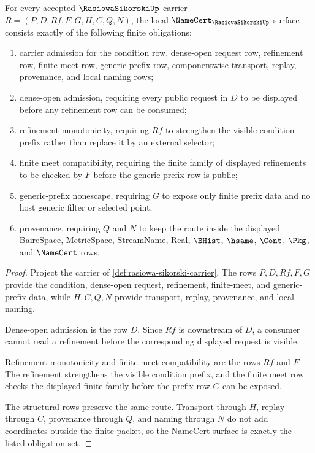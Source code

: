 \begin{theorem}
\label{thm:rasiowa-sikorski-namecert-obligations}
For every accepted $\RasiowaSikorskiUp$ carrier $R=(P,D,Rf,F,G,H,C,Q,N)$, the local $\NameCert_{\RasiowaSikorskiUp}$ surface consists exactly of the following finite obligations:
\begin{enumerate}
\item carrier admission for the condition row, dense-open request row, refinement row, finite-meet row, generic-prefix row, componentwise transport, replay, provenance, and local naming rows;
\item dense-open admission, requiring every public request in $D$ to be displayed before any refinement row can be consumed;
\item refinement monotonicity, requiring $Rf$ to strengthen the visible condition prefix rather than replace it by an external selector;
\item finite meet compatibility, requiring the finite family of displayed refinements to be checked by $F$ before the generic-prefix row is public;
\item generic-prefix nonescape, requiring $G$ to expose only finite prefix data and no host generic filter or selected point;
\item provenance, requiring $Q$ and $N$ to keep the route inside the displayed BaireSpace, MetricSpace, StreamName, Real, $\BHist$, $\hsame$, $\Cont$, $\Pkg$, and $\NameCert$ rows.
\end{enumerate}
\end{theorem}
\begin{proof}
Project the carrier of \autoref{def:rasiowa-sikorski-carrier}. The rows $P,D,Rf,F,G$ provide the condition, dense-open request, refinement, finite-meet, and generic-prefix data, while $H,C,Q,N$ provide transport, replay, provenance, and local naming.

Dense-open admission is the row $D$. Since $Rf$ is downstream of $D$, a consumer cannot read a refinement before the corresponding displayed request is visible.

Refinement monotonicity and finite meet compatibility are the rows $Rf$ and $F$. The refinement strengthens the visible condition prefix, and the finite meet row checks the displayed finite family before the prefix row $G$ can be exposed.

The structural rows preserve the same route. Transport through $H$, replay through $C$, provenance through $Q$, and naming through $N$ do not add coordinates outside the finite packet, so the NameCert surface is exactly the listed obligation set.
\end{proof}

